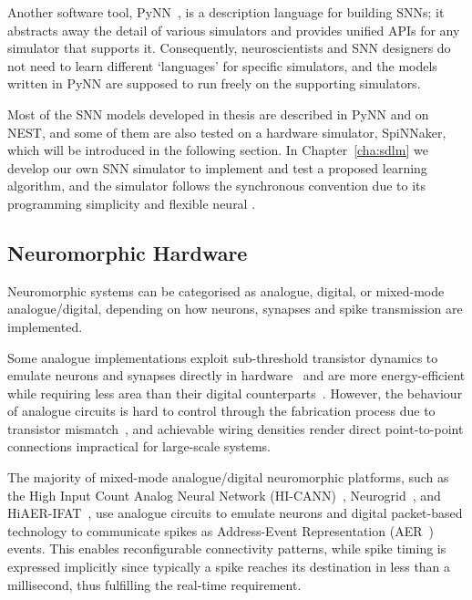 Another software tool, PyNN~\citep{davison2008pynn}, is a description language for building SNNs;
it abstracts away the detail of various simulators and provides unified APIs for any simulator that supports it.
Consequently, neuroscientists and SNN designers do not need to learn different `languages' for specific simulators, and the models written in PyNN are supposed to run freely on the supporting simulators.

Most of the SNN models developed in \DIFdelbegin {}\DIFdelend \DIFaddbegin {}\DIFaddend thesis are described in PyNN and \DIFdelbegin {}\DIFdelend \DIFaddbegin {}\DIFaddend on NEST, and some of them are also tested on a hardware simulator, SpiNNaker, which will be introduced in the following section.
In Chapter~\ref{cha:sdlm} we develop our own SNN simulator to implement and test a proposed learning algorithm, and the simulator follows the synchronous convention due to its programming simplicity and flexible neural \DIFdelbegin {}\DIFdelend \DIFaddbegin {}\DIFaddend . 

\subsection{Neuromorphic Hardware}
\label{subsec:neuromorphic_hw}
Neuromorphic systems can be categorised as analogue, digital, or mixed-mode analogue/digital, depending on how neurons, synapses and spike transmission are implemented. %

Some analogue implementations exploit sub-threshold transistor dynamics to emulate neurons and synapses directly in hardware~\citep{indiveri2011neuromorphic} and are more energy-efficient while requiring less area than their digital counterparts~\citep{joubert2012hardware}.
However, the behaviour of analogue circuits is hard to control through the fabrication process due to transistor mismatch~\citep{indiveri2011neuromorphic,pedram2006thermal,linares2003compact}, and achievable \DIFdelbegin {}\DIFdelend wiring densities render direct point-to-point connections impractical for large-scale systems.

The majority of mixed-mode analogue/digital neuromorphic platforms, such as the High Input Count Analog Neural Network (HI-CANN)~\citep{schemmel2010wafer}, Neurogrid~\citep{benjamin2014neurogrid}, and HiAER-IFAT~\citep{yu201265k}, use analogue circuits to emulate neurons and digital packet-based technology to communicate spikes as Address-Event Representation (AER~\citep{lazzaro1995multi}) events.
This enables reconfigurable connectivity patterns, while spike timing is expressed implicitly since typically a spike reaches its destination in less than a millisecond, thus fulfilling the real-time requirement.

